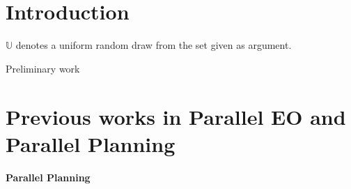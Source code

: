 \documentclass{sig-alternate}
\def\UU{{\mathbb{U}}}
\begin{document}
\section{Introduction}

$\UU$ denotes a uniform random draw from the set given as argument.


Preliminary work


\section{Previous works in Parallel EO and Parallel Planning}

\paragraph{Parallel Planning} %
\end{document}
